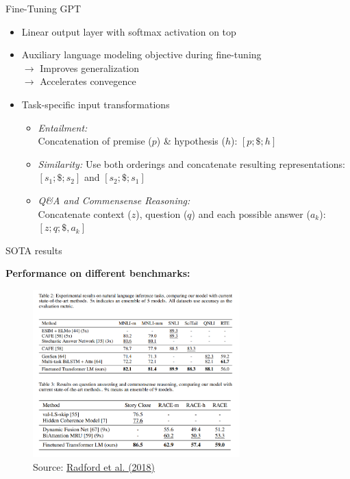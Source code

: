 \begin{vbframe}{Fine-Tuning GPT}

\vfill
			
\begin{itemize}
		\item Linear output layer with softmax activation on top
		\item Auxiliary language modeling objective during fine-tuning\\
					$\rightarrow$ Improves generalization\\
					$\rightarrow$ Accelerates convegence
		\item Task-specific input transformations
					\begin{itemize}
						\item \textit{Entailment:} \\ Concatenation of premise ($p$) \& hypothesis ($h$): $[p; \$; h]$
						\item \textit{Similarity:} Use both orderings and concatenate resulting representations: $[s_1; \$; s_2]$ and $[s_2; \$; s_1]$
						\item \textit{Q\&A and Commensense Reasoning:} \\ Concatenate context ($z$), question ($q$) and each possible answer ($a_k$): $[z; q; \$, a_k]$
					\end{itemize}
\end{itemize}

\vfill

\end{vbframe}


\begin{vbframe}{SOTA results}

\vfill

	\textbf{Performance on different benchmarks:}

	\begin{figure}
		\centering
		\includegraphics[width = 8cm]{figure/gpt-sota.png}\\ 
		\footnotesize{Source:} \href{https://s3-us-west-2.amazonaws.com/openai-assets/research-covers/language-unsupervised/language_understanding_paper.pdf}{\footnotesize Radford et al. (2018)}
	\end{figure}

\vfill

\end{vbframe}

